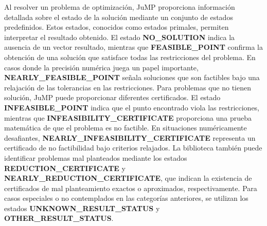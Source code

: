 Al resolver un problema de optimización, JuMP proporciona información detallada sobre el estado de la solución mediante un conjunto de estados predefinidos. Estos estados, conocidos como estados primales, permiten interpretar el resultado obtenido. El estado \textbf{NO\_SOLUTION} indica la ausencia de un vector resultado, mientras que \textbf{FEASIBLE\_POINT} confirma la obtención de una solución que satisface todas las restricciones del problema. En casos donde la precisión numérica juega un papel importante, \textbf{NEARLY\_FEASIBLE\_POINT} señala soluciones que son factibles bajo una relajación de las tolerancias en las restricciones. Para problemas que no tienen solución, JuMP puede proporcionar diferentes certificados. El estado \textbf{INFEASIBLE\_POINT} indica que el punto encontrado viola las restricciones, mientras que \textbf{INFEASIBILITY\_CERTIFICATE} proporciona una prueba matemática de que el problema es no factible. En situaciones numéricamente desafiantes, \textbf{NEARLY\_INFEASIBILITY\_CERTIFICATE} representa un certificado de no factibilidad bajo criterios relajados. La biblioteca también puede identificar problemas mal planteados mediante los estados \textbf{REDUCTION\_CERTIFICATE} y \textbf{NEARLY\_REDUCTION\_CERTIFICATE}, que indican la existencia de certificados de mal planteamiento exactos o aproximados, respectivamente. Para casos especiales o no contemplados en las categorías anteriores, se utilizan los estados \textbf{UNKNOWN\_RESULT\_STATUS} y \textbf{OTHER\_RESULT\_STATUS}.

